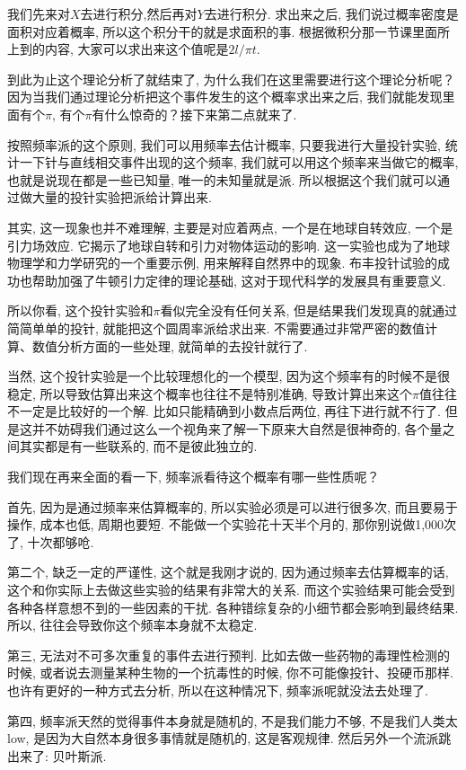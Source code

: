 我们先来对$X$去进行积分,然后再对$Y$去进行积分. 求出来之后, 我们说过概率密度是面积对应着概率, 所以这个积分干的就是求面积的事. 根据微积分那一节课里面所上到的内容, 大家可以求出来这个值呢是$2l/\pi t$. 

到此为止这个理论分析了就结束了, 为什么我们在这里需要进行这个理论分析呢？因为当我们通过理论分析把这个事件发生的这个概率求出来之后, 我们就能发现里面有个$\pi$, 有个$\pi$有什么惊奇的？接下来第二点就来了. 

按照频率派的这个原则, 我们可以用频率去估计概率, 只要我进行大量投针实验, 统计一下针与直线相交事件出现的这个频率, 我们就可以用这个频率来当做它的概率, 也就是说现在都是一些已知量, 唯一的未知量就是派. 所以根据这个我们就可以通过做大量的投针实验把派给计算出来. 

其实, 这一现象也并不难理解, 主要是对应着两点, 一个是在地球自转效应, 一个是引力场效应. 它揭示了地球自转和引力对物体运动的影响. 这一实验也成为了地球物理学和力学研究的一个重要示例, 用来解释自然界中的现象. 布丰投针试验的成功也帮助加强了牛顿引力定律的理论基础, 这对于现代科学的发展具有重要意义. 

所以你看, 这个投针实验和$\pi$看似完全没有任何关系, 但是结果我们发现真的就通过简简单单的投针, 就能把这个圆周率派给求出来. 不需要通过非常严密的数值计算、数值分析方面的一些处理, 就简单的去投针就行了. 

当然, 这个投针实验是一个比较理想化的一个模型, 因为这个频率有的时候不是很稳定, 所以导致估算出来这个概率也往往不是特别准确, 导致计算出来这个$\pi$值往往不一定是比较好的一个解. 比如只能精确到小数点后两位, 再往下进行就不行了. 但是这并不妨碍我们通过这么一个视角来了解一下原来大自然是很神奇的, 各个量之间其实都是有一些联系的, 而不是彼此独立的. 

我们现在再来全面的看一下, 频率派看待这个概率有哪一些性质呢？

首先, 因为是通过频率来估算概率的, 所以实验必须是可以进行很多次, 而且要易于操作, 成本也低, 周期也要短. 不能做一个实验花十天半个月的, 那你别说做1,000次了, 十次都够呛. 

第二个, 缺乏一定的严谨性, 这个就是我刚才说的, 因为通过频率去估算概率的话, 这个和你实际上去做这些实验的结果有非常大的关系. 而这个实验结果可能会受到各种各样意想不到的一些因素的干扰. 各种错综复杂的小细节都会影响到最终结果. 所以, 往往会导致你这个频率本身就不太稳定. 

第三, 无法对不可多次重复的事件去进行预判. 比如去做一些药物的毒理性检测的时候, 或者说去测量某种生物的一个抗毒性的时候, 你不可能像投针、投硬币那样. 也许有更好的一种方式去分析, 所以在这种情况下, 频率派呢就没法去处理了. 

第四, 频率派天然的觉得事件本身就是随机的, 不是我们能力不够, 不是我们人类太low, 是因为大自然本身很多事情就是随机的, 这是客观规律. 然后另外一个流派跳出来了: 贝叶斯派. 

